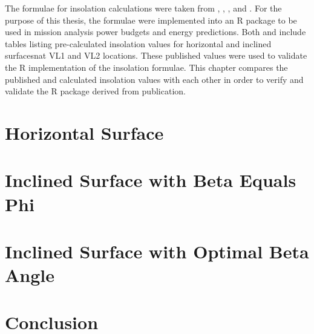 The formulae for insolation calculations were taken from , , , and . For the purpose of this thesis, the formulae were implemented into an R package to be used in mission analysis power budgets and energy predictions. Both  and  include tables listing pre-calculated insolation values for horizontal and inclined surfacesnat VL1 and VL2 locations. These published values were used to validate the R implementation of the insolation formulae. This chapter compares the published and calculated insolation values with each other in order to verify and validate the R package derived from publication.


\section{Horizontal Surface}

\clearpage

\section{Inclined Surface with Beta Equals Phi}

\clearpage

\section{Inclined Surface with Optimal Beta Angle}

\clearpage

\section{Conclusion}

\clearpage
